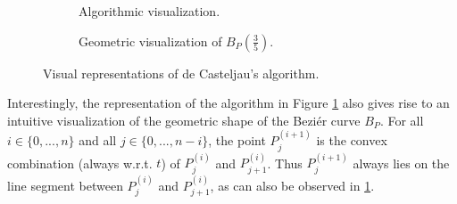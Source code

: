 \documentclass[a4paper, 11pt]{report}
\theoremstyle{definition}
\begin{document}
\begin{figure}[!h]
	\centering
	\begin{subfigure}{0.49\textwidth}
		\caption{Algorithmic visualization.}
	\end{subfigure}
	\hfill
	\begin{subfigure}{0.49\textwidth}
		
		\caption{Geometric visualization of $B_P(\frac{3}{5})$.}
	\end{subfigure}
	\caption{Visual representations of de Casteljau's algorithm.}
	\label{fig:decasteljautriangle}
\end{figure}

Interestingly, the representation of the algorithm in Figure \ref{fig:decasteljautriangle} also gives rise to an intuitive visualization of the geometric shape of the Beziér curve $B_P$. For all $i \in \{0, ..., n\}$ and all $j \in \{0, ..., n-i\}$, the point $P^{(i+1)}_j$ is the convex combination (always w.r.t. $t$) of $P^{(i)}_j$ and $P^{(i)}_{j+1}$. Thus $P^{(i+1)}_j$ always lies on the line segment between $P^{(i)}_j$ and $P^{(i)}_{j+1}$, as can also be observed in \ref{fig:decasteljautriangle}.
\end{document}
